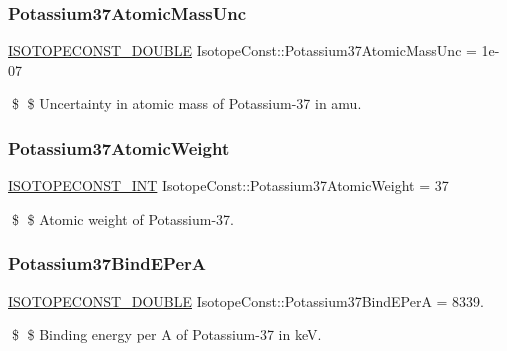 \subsubsection{\texorpdfstring{Potassium37\+Atomic\+Mass\+Unc}{Potassium37AtomicMassUnc}}
{\footnotesize\ttfamily \mbox{\hyperlink{group___isotope_const-_macros_ga8f45a7272ce02c0b4c65c44636ed719a}{I\+S\+O\+T\+O\+P\+E\+C\+O\+N\+S\+T\+\_\+\+D\+O\+U\+B\+LE}} Isotope\+Const\+::\+Potassium37\+Atomic\+Mass\+Unc = 1e-\/07}

\$ \$ Uncertainty in atomic mass of Potassium-\/37 in amu. \mbox{\label{group___isotope_const-_potassium-_k37_ga3f0f3f1f4e4e08776a03d5bb2138336f}} 
\subsubsection{\texorpdfstring{Potassium37\+Atomic\+Weight}{Potassium37AtomicWeight}}
{\footnotesize\ttfamily \mbox{\hyperlink{group___isotope_const-_macros_ga5f18360b3e99483a35c32d789e62621c}{I\+S\+O\+T\+O\+P\+E\+C\+O\+N\+S\+T\+\_\+\+I\+NT}} Isotope\+Const\+::\+Potassium37\+Atomic\+Weight = 37}

\$ \$ Atomic weight of Potassium-\/37. \mbox{\label{group___isotope_const-_potassium-_k37_ga1ef753afca142b4488b1e0790cf382a9}} 
\subsubsection{\texorpdfstring{Potassium37\+Bind\+E\+PerA}{Potassium37BindEPerA}}
{\footnotesize\ttfamily \mbox{\hyperlink{group___isotope_const-_macros_ga8f45a7272ce02c0b4c65c44636ed719a}{I\+S\+O\+T\+O\+P\+E\+C\+O\+N\+S\+T\+\_\+\+D\+O\+U\+B\+LE}} Isotope\+Const\+::\+Potassium37\+Bind\+E\+PerA = 8339.}

\$ \$ Binding energy per A of Potassium-\/37 in keV. \mbox{\label{group___isotope_const-_potassium-_k37_ga1bf118953c4d58339e91750a441facc4}} 
